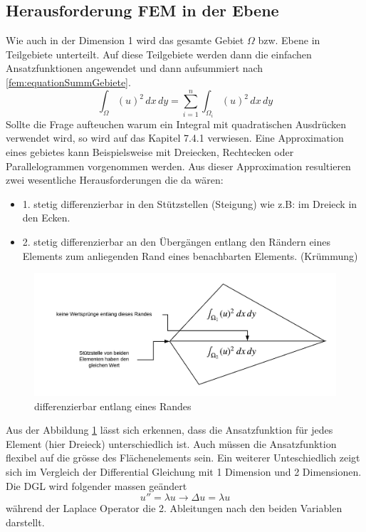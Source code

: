 \subsection{Herausforderung FEM in der Ebene}
Wie auch in der Dimension 1 wird das gesamte Gebiet $\Omega$ bzw. Ebene in Teilgebiete unterteilt. Auf diese Teilgebiete werden dann die einfachen Ansatzfunktionen angewendet und dann aufsummiert nach \eqref{fem:equationSummGebiete}.
\begin{equation}
\int_{\Omega} (u)^2 \, dx \, dy = \sum \limits_{i=1}^n \int_{\Omega_i} (u)^2 \, dx \, dy 
\label{fem:equationSummGebiete}
\end{equation}
Sollte die Frage aufteuchen warum ein Integral mit quadratischen Ausdrücken verwendet wird, so wird auf das Kapitel 7.4.1 verwiesen. Eine Approximation eines gebietes kann Beispielsweise mit Dreiecken, Rechtecken oder Parallelogrammen vorgenommen werden. Aus dieser Approximation resultieren zwei wesentliche Herausforderungen die da wären:
\begin{itemize}
	\item 1. stetig differenzierbar in den Stützstellen (Steigung) wie z.B: im Dreieck in den Ecken.
	\item 2. stetig differenzierbar an den Übergängen entlang den Rändern eines Elements zum anliegenden Rand eines benachbarten Elements. (Krümmung)
\end{itemize}
\begin{figure}[h!]
	\centering
	\includegraphics[scale=0.8]{papers/fem/Images/Rand.jpeg}
	\caption{differenzierbar entlang eines Randes}
	\label{fig:Randbedingung}
\end{figure}
Aus der Abbildung \ref{fig:Randbedingung} lässt sich erkennen, dass die Ansatzfunktion für jedes Element (hier Dreieck) unterschiedlich ist. Auch müssen die Ansatzfunktion flexibel auf die grösse des Flächenelements sein.
Ein weiterer Unteschiedlich zeigt sich im Vergleich der Differential Gleichung mit 1 Dimension und 2 Dimensionen. Die DGL wird folgender massen geändert 
\begin{equation}
	u'' = \lambda u \rightarrow \Delta u = \lambda u 
	\label{fem:DGL2D}
\end{equation} 
während der Laplace Operator die 2. Ableitungen nach den beiden Variablen darstellt.


